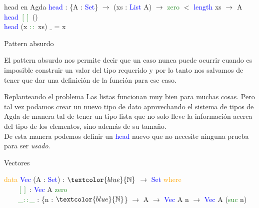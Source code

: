 \documentclass[xcolor=dvipsnames]{beamer} %
\newcommand{\cf}[1]{\textcolor{blue}{#1}}
\newcommand{\ct}[1]{\textcolor{blue}{#1}}
\newcommand{\cc}[1]{\textcolor{ForestGreen}{#1}}
\newcommand{\ck}[1]{\textcolor{orange}{#1}}
\newcommand{\N}{\ct{\mathbb{N}}}
\newcommand{\ra}{\rightarrow}
\newcommand{\T}{ \ \ \ \ }
\begin{document}
\begin{frame}

  \begin{block}{head en Agda}
    \cf{head} : \{A : \ct{Set}\}  $\ra$ (xs : \ct{List} A) $\ra$ 
    \cc{zero} $<$ \ct{length} xs $\rightarrow$ A \\
    \cf{head} \cc{$[]$} ()\\
    \cf{head} (x \cc{$::$} xs) $\_$ = x
  \end{block}
  
\begin{block}{Pattern absurdo}

El pattern absurdo nos permite decir que un caso nunca puede
ocurrir cuando es imposible construir un valor del tipo requerido y por
lo tanto nos salvamos de tener que dar una definición de la función
para ese caso.

\end{block}

\end{frame}

\begin{frame}

\begin{block}{Replanteando el problema}
Las listas funcionan muy bien para muchas cosas. Pero tal vez
podamos crear un nuevo tipo de dato aprovechando el sistema de tipos
de Agda de manera tal de tener un tipo lista que no solo lleve la
información acerca del tipo de los elementos, sino además de su
tamaño.\\

De esta manera podemos definir un \cf{head} nuevo que no necesite
ninguna prueba para ser \textit{usado}.
\end{block}

\pause

\begin{block}{Vectores}

\ck{data} \ct{Vec} (A : \ct{Set}) : $\N$ $\ra$ \ct{Set} \ck{where}\\
\pause
\T \cc{$[]$}     : \ct{Vec} A \cc{zero}\\
\pause
\T \cc{\_$::$\_} : \{n : $\N$\} $\ra$ A $\ra$ \ct{Vec} A n $\ra$ \ct{Vec} A (\cc{suc} n)

\end{block}

\end{frame}
\end{document}
